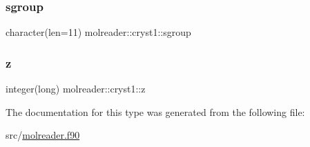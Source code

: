\subsubsection{\texorpdfstring{sgroup}{sgroup}}
{\footnotesize\ttfamily character(len=11) molreader\+::cryst1\+::sgroup\hspace{0.3cm}{\ttfamily [private]}}

\mbox{\label{structmolreader_1_1cryst1_ae973dda59fd038efc49c8a247e3e71c9}} 
\subsubsection{\texorpdfstring{z}{z}}
{\footnotesize\ttfamily integer(long) molreader\+::cryst1\+::z\hspace{0.3cm}{\ttfamily [private]}}



The documentation for this type was generated from the following file\+:\begin{DoxyCompactItemize}
\item 
src/\hyperlink{molreader_8f90}{molreader.\+f90}\end{DoxyCompactItemize}
